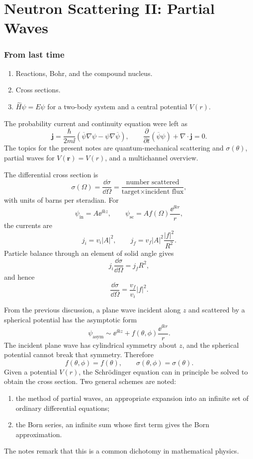 \chapter{Neutron Scattering II: Partial Waves}

\subsection*{From last time}
\begin{enumerate}
  \item Reactions, Bohr, and the compound nucleus.
  \item Cross sections.
  \item $\widehat H\psi=E\psi$ for a two-body system and a central potential $V(r)$.
\end{enumerate}
The probability current and continuity equation were left as
\[
  \bm j=\frac{\hbar}{2m\ii}\left(\overline\psi\nabla\psi-\psi\nabla\overline\psi\right),
  \qquad
  \frac{\partial}{\partial t}(\overline\psi\psi)+\nabla\cdot\bm j=0.
\]
The topics for the present notes are quantum-mechanical scattering and $\sigma(\theta)$, partial waves for $V(\bm r)=V(r)$, and a multichannel overview.

The differential cross section is
\[
  \sigma(\Omega)=\frac{\dd\sigma}{\dd\Omega}
  =\frac{\text{number scattered}}
  {\text{target}\times\text{incident flux}},
\]
with units of barns per steradian.  For
\[
  \psi_{\mathrm{in}}=A\ee^{\ii kz},
  \qquad
  \psi_{\mathrm{sc}}=A f(\Omega)\frac{\ee^{\ii kr}}{r},
\]
the currents are
\[
  j_i=v_i|A|^2,
  \qquad
  j_f=v_f|A|^2\frac{|f|^2}{R^2}.
\]
Particle balance through an element of solid angle gives
\[
  j_i\frac{\dd\sigma}{\dd\Omega}=j_fR^2,
\]
and hence
\begin{equation}
  \frac{\dd\sigma}{\dd\Omega}=\frac{v_f}{v_i}|f|^2.
  \label{eq:ns2-diff-xs}
\end{equation}

From the previous discussion, a plane wave incident along $z$ and scattered by a spherical potential has the asymptotic form
\[
  \psi_{\mathrm{asym}}\sim \ee^{\ii kz}+f(\theta,\phi)\frac{\ee^{\ii kr}}{r}.
\]
The incident plane wave has cylindrical symmetry about $z$, and the spherical potential cannot break that symmetry.  Therefore
\[
  f(\theta,\phi)=f(\theta),
  \qquad
  \sigma(\theta,\phi)=\sigma(\theta).
\]
Given a potential $V(r)$, the Schr\"odinger equation can in principle be solved to obtain the cross section.  Two general schemes are noted:
\begin{enumerate}
  \item the method of partial waves, an appropriate expansion into an infinite set of ordinary differential equations;
  \item the Born series, an infinite sum whose first term gives the Born approximation.
\end{enumerate}
The notes remark that this is a common dichotomy in mathematical physics.


